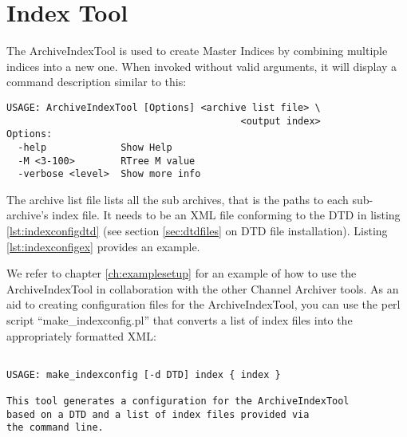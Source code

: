 \section{Index Tool} \label{sec:indextool}
The ArchiveIndexTool is used to create Master Indices by combining
multiple indices into a new one.  When invoked without valid
arguments, it will display a command description similar to this:

\begin{lstlisting}[frame=none,keywordstyle=\sffamily]
USAGE: ArchiveIndexTool [Options] <archive list file> \
                                         <output index> 
Options:
  -help             Show Help
  -M <3-100>        RTree M value
  -verbose <level>  Show more info
\end{lstlisting}

\noindent The archive list file lists all the sub archives,
that is the paths to each sub-archive's index file. It needs to be an
XML file conforming to the DTD in listing \ref{lst:indexconfigdtd}
(see section \ref{sec:dtdfiles} on DTD file installation).
Listing \ref{lst:indexconfigex} provides an example.





We refer to chapter \ref{ch:examplesetup} for an example of how to use
the ArchiveIndexTool in collaboration with the other Channel Archiver
tools. As an aid to creating configuration files for the
ArchiveIndexTool, you can use the perl script ``make\_indexconfig.pl''
that converts a list of index files into the appropriately formatted XML:
\begin{lstlisting}[frame=none,keywordstyle=\sffamily]

USAGE: make_indexconfig [-d DTD] index { index }
 
This tool generates a configuration for the ArchiveIndexTool
based on a DTD and a list of index files provided via
the command line.
\end{lstlisting}
